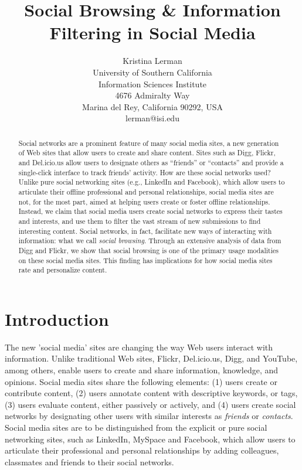 \documentclass[]{article}
\begin{document}
\title{Social Browsing \& Information Filtering in Social Media}
\author{Kristina Lerman\\
University of Southern California \\
Information Sciences Institute\\
4676 Admiralty Way\\
Marina del Rey, California 90292, USA\\
lerman@isi.edu}

\maketitle


\begin{abstract}
Social networks are a prominent feature of many social media sites,
a new generation of Web sites that
allow users to create and share content.
Sites such as Digg, Flickr, and Del.icio.us allow users to designate others as
``friends'' or ``contacts'' and provide a single-click interface to track friends' activity.
How are these social networks
used? Unlike pure social networking sites (e.g., LinkedIn and Facebook), which allow
users to articulate their offline professional and personal
relationships, social media sites are not, for the most part, aimed at helping
users create or foster offline relationships.
Instead, we claim that social media users
create social networks to express their tastes and interests,
and use them to filter the vast stream of new
submissions to find interesting content.
Social networks, in fact, facilitate new ways of
interacting with information: what we call
\emph{social browsing}. Through an
extensive analysis of data from Digg and Flickr,
we show that social browsing is one of the primary usage modalities on these social media sites.
This finding has implications for how social media sites rate
and personalize content.

\end{abstract}




\section{Introduction}

The new 'social media' sites are changing the way Web users
interact with information. Unlike traditional Web sites,
Flickr, Del.icio.us, Digg, and YouTube, among others, enable
users to create and share information, knowledge, and opinions.
Social media sites share
the following elements: (1) users create or contribute
content, (2) users annotate content with descriptive keywords, or
tags, (3) users evaluate content, either passively or actively,
and (4) users create social networks by designating other users
with similar interests as \emph{friends} or \emph{contacts}.
Social media sites are to be distinguished from the explicit or pure social networking
sites, such as LinkedIn, MySpace and Facebook, which allow users to
articulate their professional and personal relationships by adding
colleagues, classmates and friends to their social networks.
\end{document}
